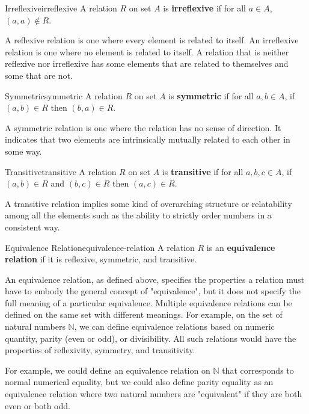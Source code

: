 \begin{definition}{Irreflexive}{irreflexive}
  A relation \( R \) on set \( A \) is \textbf{irreflexive} if for all
  \( a \in A \), \( (a, a) \notin R \).
\end{definition}

A reflexive relation is one where every element is related to itself. An
irreflexive relation is one where no element is related to itself. A relation
that is neither reflexive nor irreflexive has some elements that are related
to themselves and some that are not.

\begin{definition}{Symmetric}{symmetric}
  A relation \( R \) on set \( A \) is \textbf{symmetric} if for all
  \( a, b \in A \), if \( (a, b) \in R \) then \( (b, a) \in R \).
\end{definition}

A symmetric relation is one where the relation has no sense of direction. It
indicates that two elements are intrinsically mutually related to each other
in some way.

\begin{definition}{Transitive}{transitive}
  A relation \( R \) on set \( A \) is \textbf{transitive} if for all
  \( a, b, c \in A \), if \( (a, b) \in R \) and \( (b, c) \in R \) then
  \( (a, c) \in R \).
\end{definition}

A transitive relation implies some kind of overarching structure or relatability
among all the elements such as the ability to strictly order numbers in a
consistent way.

\begin{definition}{Equivalence Relation}{equivalence-relation}
  A relation \( R \) is an \textbf{equivalence relation} if it is reflexive,
  symmetric, and transitive.
\end{definition}

An equivalence relation, as defined above, specifies the properties a relation
must have to embody the general concept of "equivalence", but it does not
specify the full meaning of a particular equivalence. Multiple equivalence relations
can be defined on the same set with different meanings. For example, on the set of
natural numbers \( \mathbb{N} \), we can define equivalence relations based on
numeric quantity, parity (even or odd), or divisibility. All such relations would
have the properties of reflexivity, symmetry, and transitivity.

For example, we could define an equivalence relation on \( \mathbb{N} \) that corresponds
to normal numerical equality, but we could also define parity equality as an equivalence
relation where two natural numbers are "equivalent" if they are both even or both odd.

